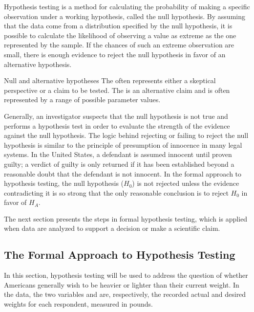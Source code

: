 Hypothesis testing is a method for calculating the probability of making a specific observation under a working hypothesis, called the null hypothesis. By assuming that the data come from a distribution specified by the null hypothesis, it is possible to calculate the likelihood of observing a value as extreme as the one represented by the sample. If the chances of such an extreme observation are small, there is enough evidence to reject the null hypothesis in favor of an alternative hypothesis. 

\begin{onebox}{Null and alternative hypotheses}
  {The  often represents either a skeptical perspective or a claim to be tested. The  is an alternative claim and is often represented by a range of possible parameter values.}
\end{onebox}

Generally, an investigator suspects that the null hypothesis is not true and performs a hypothesis test in order to evaluate the strength of the evidence against the null hypothesis. The logic behind rejecting or failing to reject the null hypothesis is similar to the principle of presumption of innocence in many legal systems. In the United States, a defendant is assumed innocent until proven guilty; a verdict of guilty is only returned if it has been established beyond a reasonable doubt that the defendant is not innocent. In the formal approach to hypothesis testing, the null hypothesis ($H_0$) is not rejected unless the evidence contradicting it is so strong that the only reasonable conclusion is to reject $H_0$ in favor of $H_A$. 

The next section presents the steps in formal hypothesis testing, which is applied when data are analyzed to support a decision or make a scientific claim.


\subsection{The Formal Approach to Hypothesis Testing}
\label{formalHypothesisTesting}

In this section, hypothesis testing will be used to address the question of whether Americans generally wish to be heavier or lighter than their current weight. In the  data, the two variables  and  are, respectively, the recorded actual and desired weights for each respondent, measured in pounds. 

